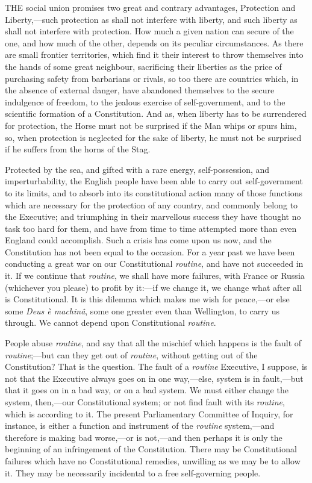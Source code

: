 
THE
social union promises two great and contrary advantages, Protection
and Liberty,—such protection as shall not interfere with liberty,
and such liberty as shall not interfere with protection. How much a
given nation can secure of the one, and how much of the other, depends
on its peculiar circumstances. As there are small frontier
territories, which find it their interest to throw themselves into the
hands of some great neighbour, sacrificing their liberties as the
price of purchasing safety from barbarians or rivals, so too there are
countries which, in the absence of external danger, have abandoned
themselves to the secure indulgence of freedom, to the jealous
exercise of self-government, and to the scientific formation of a
Constitution. And as, when liberty has to be surrendered for
protection, the Horse must not be surprised if the Man whips or spurs
him, so, when protection is neglected for the sake of liberty, he must
not be surprised if he suffers from the horns of the Stag.

Protected by the sea, and gifted with a rare
energy, self-possession, and imperturbability, the English people have
been able to carry out self-government to its limits, and to absorb
into its constitutional action many of those functions which are
necessary for the protection of any country, and commonly belong to
the Executive; and triumphing in their marvellous success they have
thought no task too hard for them, and have from time to time
attempted more than even England could accomplish. Such a crisis has
come upon us now, and the Constitution has not been equal to the
occasion. For a year past we have been conducting a great war on our
Constitutional \emph{routine}, and have not succeeded in it. If we
continue that \emph{routine}, we shall have more failures, with France
or Russia (whichever you please) to profit by it:—if we change it,
we change what after all is Constitutional. It is this dilemma which
makes me wish for peace,—or else some \emph{Deus è machinâ}, some
one greater even than Wellington, to carry us through. We cannot
depend upon Constitutional \emph{routine}.

People abuse \emph{routine}, and say that all the
mischief which happens is the fault of \emph{routine};—but can they
get out of \emph{routine}, without getting out of the Constitution?
That is the question. The fault of a \emph{routine} Executive, I
suppose, is not that the Executive always goes on in one way,—else,
system is in fault,—but that it goes on in a bad way, or on a bad
system. We must either change the system, then,—our Constitutional
system; or not find fault with its \emph{routine}, which is according
to it. The present Parliamentary Committee of Inquiry, for instance,
is either a function and instrument of the \emph{routine}
system,—and therefore is making bad worse,—or is not,—and then
perhaps it is only the beginning of an infringement of the
Constitution. There may be Constitutional failures which have no
Constitutional remedies, unwilling as we may be to allow it. They may
be necessarily incidental to a free self-governing people.

